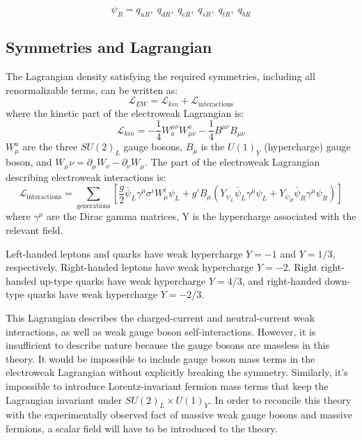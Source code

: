 \begin{equation}\label{eq:right_handed_quarks}
\psi_R = q_{uR},\; q_{dR},\; q_{cR},\; q_{sR},\; q_{tR},\; q_{bR}
\end{equation}

\subsection{Symmetries and Lagrangian}\label{subsec:ew_lagrangian}

The Lagrangian density satisfying the required symmetries, including all renormalizable terms, can be written as:
\begin{equation}\label{eq:ew_lagrangian}
    \mathcal{L}_{EW} = \mathcal{L}_{kin} + \mathcal{L}_{\text{interactions}}
\end{equation}
where the kinetic part of the electroweak Lagrangian is:
\begin{equation}\label{eq:ew_kin}
    \mathcal{L}_{kin} = -\frac{1}{4}W^{\mu \nu}_{a}W_{\mu \nu}^{a}-\frac{1}{4}B^{\mu \nu}B_{\mu \nu}
\end{equation}
$W_\mu^a$ are the three $SU(2)_L$ gauge bosons, $B_\mu$ is the $U(1)_Y$ (hypercharge) gauge boson, and $W_\mu\nu = \partial_{\mu} W_{\nu} - \partial_{\nu} W_{\mu}$.
The part of the electroweak Lagrangian describing electroweak interactions is:
\begin{equation}\label{eq:ew_int}
    \mathcal{L}_{\text{interactions}} = \sum_{\text{generations}}\left[\frac{g}{2}\bar{\psi}_{L}\gamma^\mu\sigma^i W_\mu^i \psi_L+
    g'B_\mu\left(Y_{\psi_L}\bar{\psi}_L\gamma^\mu\psi_L + Y_{\psi_R}\bar{\psi}_R\gamma^\mu \psi_R\right)\right]
\end{equation}
where $\gamma^\mu$ are the Dirac gamma matrices, Y is the hypercharge associated with the relevant field.

Left-handed leptons and quarks have weak hypercharge $Y = -1$ and $Y = 1/3$, respectively.
Right-handed leptons have weak hypercharge $Y = -2$. Right right-handed up-type quarks have weak hypercharge $Y = 4/3$,
and right-handed down-type quarks have weak hypercharge $Y = -2/3$.

This Lagrangian describes the charged-current and neutral-current weak interactions, as well as weak gauge boson self-interactions.
However, it is insufficient to describe nature because the gauge bosons are massless in this theory.
It would be impossible to include gauge boson mass terms in the electroweak Lagrangian without explicitly breaking the symmetry.
Similarly, it's impossible to introduce Lorentz-invariant fermion mass terms that keep the Lagrangian invariant under $SU(2)_L \times U(1)_Y$.
In order to reconcile this theory with the experimentally observed fact of massive weak gauge bosons and massive fermions, a scalar field will have to be introduced to the theory.

